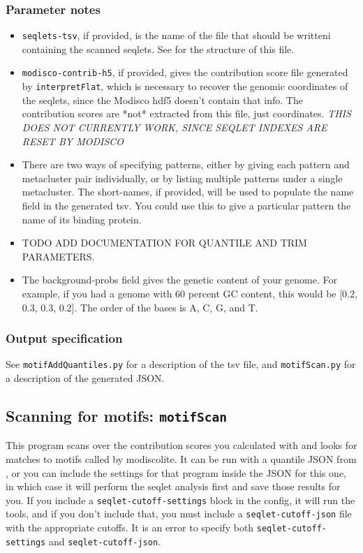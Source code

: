 \documentclass{article}
\begin{document}
\subsubsection{Parameter notes}
\begin{itemize}
    \item \texttt{seqlets-tsv}, if provided, is the name of the file that should be writteni
        containing the scanned seqlets.
        See  for the structure of this file.
    \item \texttt{modisco-contrib-h5}, if provided, gives the contribution score file
        generated by \texttt{interpretFlat}, which is necessary to recover the genomic
        coordinates of the seqlets, since the Modisco hdf5 doesn't contain that info.
        The contribution scores are *not* extracted from this file, just coordinates.
        \emph{THIS DOES NOT CURRENTLY WORK, SINCE SEQLET INDEXES ARE RESET BY MODISCO}
    \item There are two ways of specifying patterns, either by giving each pattern and
        metacluster pair individually, or by listing multiple patterns under a single
        metacluster.
        The short-names, if provided, will be used to populate the name field in the
        generated tsv.
        You could use this to give a particular pattern the name of its binding protein.
    \item TODO ADD DOCUMENTATION FOR QUANTILE AND TRIM PARAMETERS.
    \item The background-probs field gives the genetic content of your genome. For example, if
        you had a genome with 60 percent GC content, this would be [0.2, 0.3, 0.3, 0.2].
        The order of the bases is A, C, G, and T.
\end{itemize}

\subsubsection{Output specification}
See \texttt{motifAddQuantiles.py} for a description of the tsv file,
and \texttt{motifScan.py} for a description of the generated JSON.


\newpage


\subsection{Scanning for motifs: \texttt{motifScan}}\label{prog:motifScan}

This program scans over the contribution scores you calculated with 
and looks for matches to motifs called by modiscolite.
It can be run with a quantile JSON from , or you can
include the settings for that program inside the JSON for this one, in which case it
will perform the seqlet analysis first and save those results for you.
If you include a \texttt{seqlet-cutoff-settings} block in the config, it will run
the  tools, and if you don't include that, you must include
a \texttt{seqlet-cutoff-json} file with the appropriate cutoffs.
It is an error to specify both \texttt{seqlet-cutoff-settings} and \texttt{seqlet-cutoff-json}.
\end{document}
